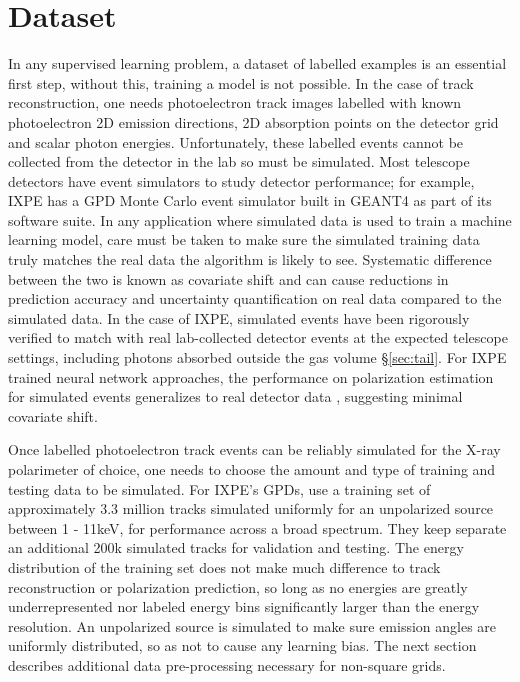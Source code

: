 \section{Dataset}
\label{sec:data}
In any supervised learning problem, a dataset of labelled examples is an essential first step, without this, training a model is not possible. In the case of track reconstruction, one needs photoelectron track images labelled with known photoelectron 2D emission directions, 2D absorption points on the detector grid and scalar photon energies. Unfortunately, these labelled events cannot be collected from the detector in the lab so must be simulated. Most telescope detectors have event simulators to study detector performance; for example, IXPE has a GPD Monte Carlo event simulator built in GEANT4 \citep{agostinelli_geant4simulation_2003} as part of its software suite. In any application where simulated data is used to train a machine learning model, care must be taken to make sure the simulated training data truly matches the real data the algorithm is likely to see. Systematic difference between the two is known as covariate shift and can cause reductions in prediction accuracy and uncertainty quantification on real data compared to the simulated data. In the case of IXPE, simulated events have been rigorously verified to match with real lab-collected detector events \citep{baldini_design_2021} at the expected telescope settings, including photons absorbed outside the gas volume \S\ref{sec:tail}. For IXPE trained neural network approaches, the performance on polarization estimation for simulated events generalizes to real detector data \citep{peirson_deep_2021, peirson_towards_2021}, suggesting minimal covariate shift.

Once labelled photoelectron track events can be reliably simulated for the X-ray polarimeter of choice, one needs to choose the amount and type of training and testing data to be simulated. For IXPE's GPDs, \citep{peirson_deep_2021, peirson_towards_2021} use a training set of approximately 3.3 million tracks simulated uniformly for an unpolarized source between 1 - 11keV, for performance across a broad spectrum. They keep separate an additional 200k simulated tracks for validation and testing. The energy distribution of the training set does not make much difference to track reconstruction or polarization prediction, so long as no energies are greatly underrepresented nor labeled energy bins significantly larger than the energy resolution. An unpolarized source is simulated to make sure emission angles are uniformly distributed, so as not to cause any learning bias. The next section describes additional data pre-processing necessary for non-square grids.

